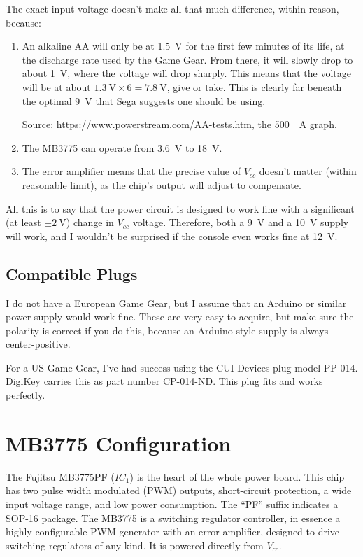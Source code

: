 \documentclass{article}
\newcommand{\Vcc}{$V_{cc}$}
\newcommand{\model}{\textsf}
\begin{document}
The exact input voltage doesn't make all that much difference, within
reason, because:

\begin{enumerate}
\item An alkaline AA will only be at \qty{1.5}{\volt} for the first
  few minutes of its life, at the discharge rate used by the Game
  Gear. From there, it will slowly drop to about \qty{1}{\volt}, where
  the voltage will drop sharply. This means that the voltage will be
  at about $\qty{1.3}{\volt} \times{} 6 = \qty{7.8}{\volt}$, give or
  take. This is clearly far beneath the optimal \qty{9}{\volt} that
  Sega suggests one should be using.

  Source: \url{https://www.powerstream.com/AA-tests.htm}, the
  \qty{500}{\milli{}A} graph.
\item The \model{MB3775} can operate from \qty{3.6}{\volt} to
  \qty{18}{\volt}. 
\item The error amplifier means that the precise value of \Vcc{}
  doesn't matter (within reasonable limit), as the chip's output will
  adjust to compensate.
\end{enumerate}

All this is to say that the power circuit is designed to work fine
with a significant (at least $\pm{}\qty{2}{\volt}$) change in \Vcc{}
voltage. Therefore, both a \qty{9}{\volt} and a \qty{10}{\volt} supply
will work, and I wouldn't be surprised if the console even works fine
at \qty{12}{\volt}.

\subsection{Compatible Plugs}
I do not have a European Game Gear, but I assume that an Arduino or
similar power supply would work fine. These are very easy to acquire,
but make sure the polarity is correct if you do this, because an
Arduino-style supply is always center-positive.

For a US Game Gear, I've had success using the CUI Devices plug model
\model{PP-014}. DigiKey carries this as part number
\model{CP-014-ND}. This plug fits and works perfectly.

\section{\model{MB3775} Configuration}
The Fujitsu \model{MB3775PF} ($IC_1$) is the heart of the whole power
board. This chip has two pulse width modulated (PWM) outputs,
short-circuit protection, a wide input voltage range, and low power
consumption. The ``\model{PF}'' suffix indicates a \model{SOP-16}
package. The \model{MB3775} is a switching regulator controller, in
essence a highly configurable PWM generator with an error amplifier,
designed to drive switching regulators of any kind. It is powered
directly from \Vcc{}.
\end{document}

